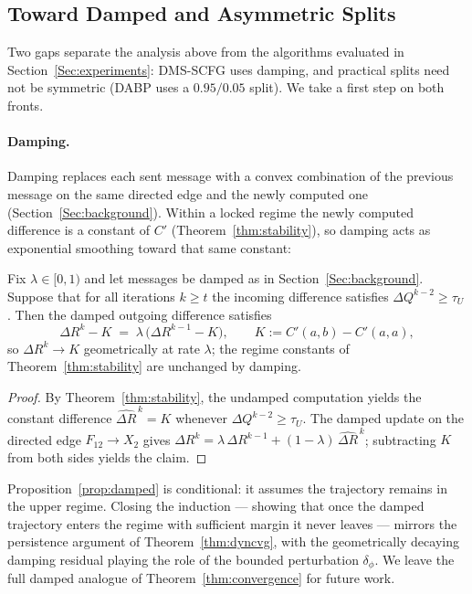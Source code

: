 \subsection{Toward Damped and Asymmetric Splits}\label{sec:extensions}
Two gaps separate the analysis above from the algorithms evaluated in Section~\ref{Sec:experiments}: DMS-SCFG uses damping, and practical splits need not be symmetric (DABP uses a $0.95/0.05$ split). We take a first step on both fronts.

\paragraph{Damping.}
Damping replaces each sent message with a convex combination of the previous message on the same directed edge and the newly computed one (Section~\ref{Sec:background}). Within a locked regime the newly computed difference is a constant of $C'$ (Theorem~\ref{thm:stability}), so damping acts as exponential smoothing toward that same constant:
\begin{proposition}\label{prop:damped}
Fix $\lambda \in [0,1)$ and let messages be damped as in Section~\ref{Sec:background}. Suppose that for all iterations $k \geq t$ the incoming difference satisfies $\Delta Q^{k-2} \geq \tau_U$. Then the damped outgoing difference satisfies
\[
    \Delta R^{k} - K \;=\; \lambda\,\bigl(\Delta R^{k-1} - K\bigr),
    \qquad K := C'(a,b) - C'(a,a),
\]
so $\Delta R^k \to K$ geometrically at rate $\lambda$; the regime constants of Theorem~\ref{thm:stability} are unchanged by damping.
\end{proposition}
\begin{proof}
By Theorem~\ref{thm:stability}, the undamped computation yields the constant difference $\widehat{\Delta R}^{\,k} = K$ whenever $\Delta Q^{k-2} \geq \tau_U$. The damped update on the directed edge $F_{12} \to X_2$ gives $\Delta R^{k} = \lambda\, \Delta R^{k-1} + (1-\lambda)\, \widehat{\Delta R}^{\,k}$; subtracting $K$ from both sides yields the claim.
\end{proof}
Proposition~\ref{prop:damped} is conditional: it assumes the trajectory remains in the upper regime. Closing the induction --- showing that once the damped trajectory enters the regime with sufficient margin it never leaves --- mirrors the persistence argument of Theorem~\ref{thm:dyncvg}, with the geometrically decaying damping residual playing the role of the bounded perturbation $\delta_\phi$. We leave the full damped analogue of Theorem~\ref{thm:convergence} for future work.

